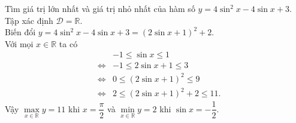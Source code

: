 \begin{bt}%
	Tìm giá trị lớn nhất và giá trị nhỏ nhất của hàm số  $y=4 \sin ^{2} x-4 \sin x+3$.
	\loigiai
	{
		Tập xác định $\mathscr{D}=\mathbb{R}$.\\
		Biến đổi $y=4 \sin ^{2} x-4 \sin x+3=\left(2\sin x+1\right)^2+2$.\\
		Với mọi $x\in \mathbb{R}$ ta có
		\allowdisplaybreaks
		\begin{eqnarray*}
			& & -1\leq \sin x\leq 1\\
			&\Leftrightarrow& -1\leq 2\sin x+1\leq 3\\
			&\Leftrightarrow&0\leq \left( 2\sin x+1\right)^2\leq 9\\
			&\Leftrightarrow&2\leq \left( 2\sin x+1\right)^2+2\leq 11.
		\end{eqnarray*}
		Vậy $\max\limits_{x \in \mathbb{R}} y=11$ khi $x=\dfrac{\pi}{2}$ và $\min\limits_{x \in \mathbb{R}} y=2$ khi $\sin x=-\dfrac{1}{2}$.
	}
\end{bt}

